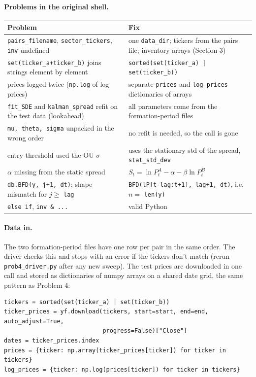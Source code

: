\documentclass[11pt]{article}
\begin{document}
\paragraph{Problems in the original shell.}
\begin{center}
\small
\begin{tabular}{p{}p{}}
    \toprule
    Problem & Fix \\
    \midrule
    \texttt{pairs\_filename}, \texttt{sector\_tickers}, \texttt{inv} undefined
        & one \texttt{data\_dir}; tickers from the pairs file; inventory arrays (Section 3) \\
    \texttt{set(ticker\_a+ticker\_b)} joins strings element by element
        & \texttt{sorted(set(ticker\_a) | set(ticker\_b))} \\
    prices logged twice (\texttt{np.log} of log prices)
        & separate \texttt{prices} and \texttt{log\_prices} dictionaries of arrays \\
    \texttt{fit\_SDE} and \texttt{kalman\_spread} refit on the test data (lookahead)
        & all parameters come from the formation-period files \\
    \texttt{mu, theta, sigma} unpacked in the wrong order
        & no refit is needed, so the call is gone \\
    entry threshold used the OU $\sigma$
        & uses the stationary std of the spread, \texttt{stat\_std\_dev} \\
    $\alpha$ missing from the static spread
        & $S_t = \ln P^A_t - \alpha - \beta\ln P^B_t$ \\
    \texttt{db.BFD(y, j+1, dt)}: shape mismatch for $j \ge$ \texttt{lag}
        & \texttt{BFD(lP[t-lag:t+1], lag+1, dt)}, i.e.\ $n = $ \texttt{len(y)} \\
    \texttt{else if}, \texttt{inv \& ...}
        & valid Python \\
    \bottomrule
\end{tabular}
\end{center}

\paragraph{Data in.} The two formation-period files have one row per pair in
the same order. The driver checks this and stops with an error if the tickers
don't match (rerun \texttt{prob4\_driver.py} after any new sweep). The test
prices are downloaded in one call and stored as dictionaries of numpy arrays
on a shared date grid, the same pattern as Problem 4:
\begin{lstlisting}
tickers = sorted(set(ticker_a) | set(ticker_b))
ticker_prices = yf.download(tickers, start=start, end=end, auto_adjust=True,
                            progress=False)["Close"]
dates = ticker_prices.index
prices = {ticker: np.array(ticker_prices[ticker]) for ticker in tickers}
log_prices = {ticker: np.log(prices[ticker]) for ticker in tickers}
\end{lstlisting}
\end{document}
